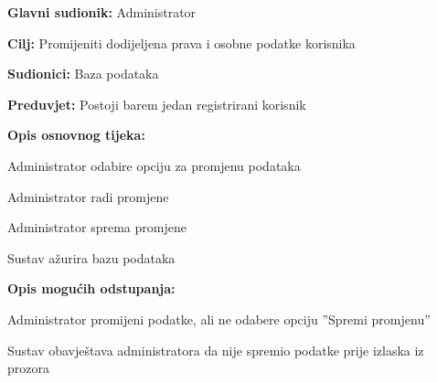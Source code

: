 					\noindent {}
					\begin{packed_item}
						
						\item \textbf{Glavni sudionik: }Administrator
						\item  \textbf{Cilj:} Promijeniti dodijeljena prava i osobne podatke korisnika 
						\item  \textbf{Sudionici:} Baza podataka
						\item  \textbf{Preduvjet:} Postoji barem jedan registrirani korisnik
						\item  \textbf{Opis osnovnog tijeka:}
						
						\item[] \begin{packed_enum}
							
							\item Administrator odabire opciju za promjenu podataka 
							\item Administrator radi promjene 
							\item Administrator sprema promjene 
							\item Sustav ažurira bazu podataka
						\end{packed_enum}
						
						\item  \textbf{Opis mogućih odstupanja:}
						
						\item[] \begin{packed_item}
							
							\item[3.a] Administrator promijeni podatke, ali ne odabere opciju ”Spremi promjenu” 
							\item[] \begin{packed_enum}
								
								\item Sustav obavještava administratora da nije spremio podatke prije izlaska iz prozora
								
							\end{packed_enum}
							
						\end{packed_item}
					\end{packed_item}
					
